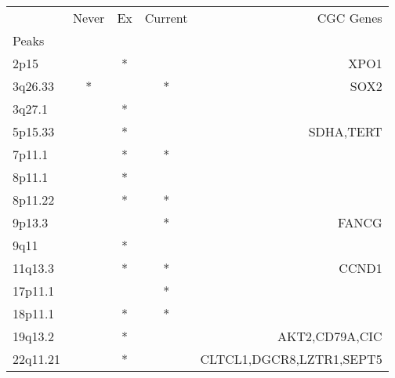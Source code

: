 \begin{tabular}{lcccr}
\toprule
{} & Never & Ex & Current &                 CGC Genes \\
Peaks    &       &    &         &                           \\
\midrule
2p15     &       &  * &         &                      XPO1 \\
3q26.33  &     * &    &       * &                      SOX2 \\
3q27.1   &       &  * &         &                           \\
5p15.33  &       &  * &         &                 SDHA,TERT \\
7p11.1   &       &  * &       * &                           \\
8p11.1   &       &  * &         &                           \\
8p11.22  &       &  * &       * &                           \\
9p13.3   &       &    &       * &                     FANCG \\
9q11     &       &  * &         &                           \\
11q13.3  &       &  * &       * &                     CCND1 \\
17p11.1  &       &    &       * &                           \\
18p11.1  &       &  * &       * &                           \\
19q13.2  &       &  * &         &            AKT2,CD79A,CIC \\
22q11.21 &       &  * &         &  CLTCL1,DGCR8,LZTR1,SEPT5 \\
\bottomrule
\end{tabular}
